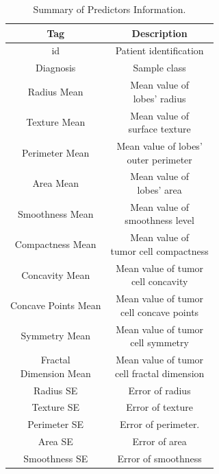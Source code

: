 \documentclass[conference]{IEEEtran}
\begin{document}
\begin{table}[htbp]
\caption{Summary of Predictors Information.}
\begin{center}
\begin{tabular}{|c|c|}
    \hline
    \cline{2-2} 
    \textbf{Tag} & \textbf{Description} \\
    \hline
    id & Patient identification \\
    \hline
    Diagnosis & Sample class \\
    \hline
    Radius Mean & \makecell{Mean value of \\ lobes' radius} \\
    \hline
    Texture Mean & \makecell{Mean value of \\ surface texture} \\
    \hline
    Perimeter Mean & \makecell{Mean value of lobes' \\ outer perimeter} \\
    \hline
    Area Mean & \makecell{Mean value of \\ lobes' area} \\
    \hline
    Smoothness Mean & \makecell{Mean value of \\ smoothness level} \\
    \hline
    Compactness Mean & \makecell{Mean value of \\ tumor cell compactness} \\
    \hline
    Concavity Mean & \makecell{Mean value of tumor \\ cell concavity} \\
    \hline
    Concave Points Mean &  \makecell{Mean value of tumor\\ cell concave points} \\
    \hline
    Symmetry Mean & \makecell{Mean value of tumor\\ cell symmetry} \\
    \hline
    \makecell{Fractal \\ Dimension Mean} & \makecell{Mean value of tumor \\ cell fractal dimension} \\
    \hline
    Radius SE & Error of radius \\
    \hline
    Texture SE & Error of texture \\
    \hline
    Perimeter SE & Error of perimeter. \\
    \hline
    Area SE & Error of area \\
    \hline
    Smoothness SE & Error of smoothness \\

\end{tabular}
\end{center}
\end{table}
\end{document}
